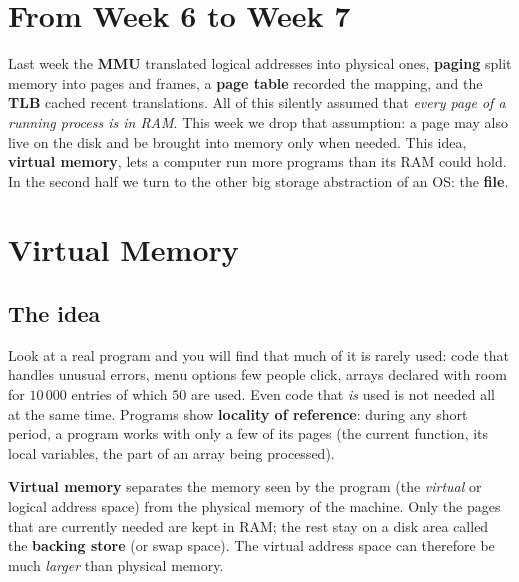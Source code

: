 \documentclass[11pt,a4paper]{article}
\newcommand{\term}[1]{\textbf{\color{mintdeep}#1}}
\begin{document}
\setcounter{tocdepth}{1}
\tableofcontents

\section{From Week 6 to Week 7}

Last week the \term{MMU} translated logical addresses into physical ones, \term{paging} split memory into pages and frames, a \term{page table} recorded the mapping, and the \term{TLB} cached recent translations. All of this silently assumed that \emph{every page of a running process is in RAM}. This week we drop that assumption: a page may also live on the disk and be brought into memory only when needed. This idea, \term{virtual memory}, lets a computer run more programs than its RAM could hold. In the second half we turn to the other big storage abstraction of an OS: the \term{file}.

\section{Virtual Memory}

\subsection{The idea}

Look at a real program and you will find that much of it is rarely used: code that handles unusual errors, menu options few people click, arrays declared with room for $10\,000$ entries of which $50$ are used. Even code that \emph{is} used is not needed all at the same time. Programs show \term{locality of reference}: during any short period, a program works with only a few of its pages (the current function, its local variables, the part of an array being processed).

\begin{keyidea}
\textbf{Virtual memory} separates the memory seen by the program (the \emph{virtual} or logical address space) from the physical memory of the machine. Only the pages that are currently needed are kept in RAM; the rest stay on a disk area called the \term{backing store} (or swap space). The virtual address space can therefore be much \emph{larger} than physical memory.
\end{keyidea}
\end{document}
